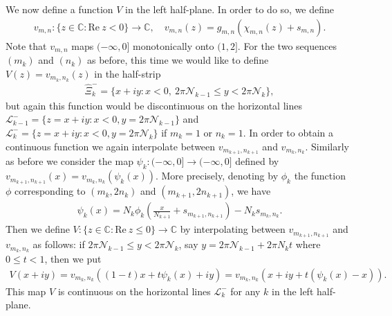 \documentclass[12pt]{amsart}
\numberwithin{equation}{section}
\begin{document}
We now define a function $V$ in the left half-plane. In order to do so, we define
\begin{equation*}
\begin{split}
v_{m,n}:\{z\in\mathbb{C}: \text{Re}\ z< 0\}\to \mathbb{C},  \quad v_{m,n}(z)=g_{m,n}\left(\chi_{m,n}(z)+s_{m,n}\right).
\end{split}
\end{equation*}
Note that $v_{m,n}$ maps $(-\infty,0]$ monotonically onto $(1,2]$. For the two sequences $(m_k)$ and $(n_k)$ as before, this time we would like to define $V(z)=v_{m_k,n_k}(z)$ in the half-strip
\begin{equation}\label{halfstrip-2}
\begin{split}
\hat{\Xi}_k^{-}=\{x+iy: x<0, \ 2\pi \mathcal{N}_{k-1}\leq y<2\pi \mathcal{N}_k\},
\end{split}
\end{equation}
but again this function would be discontinuous on the horizontal lines $\mathcal{L}^{-}_{k-1}=\{z=x+iy: x<0, y=2\pi\mathcal{N}_{k-1}\}$ and $\mathcal{L}^{-}_k=\{z=x+iy: x<0, y=2\pi\mathcal{N}_{k}\}$ if $m_k=1$ or $n_k=1$. In order to obtain a continuous function we again interpolate between $v_{m_{k+1},n_{k+1}}$ and $v_{m_k,n_k}$. Similarly as before we consider the map $\psi_k:(-\infty,0]\to (-\infty,0]$ defined by $v_{m_{k+1},n_{k+1}}(x)=v_{m_k,n_k}(\psi_k(x))$. More precisely, denoting by $\phi_k$ the function $\phi$ corresponding to $(m_k,2n_k)$ and $(m_{k+1},2n_{k+1})$, we have
\begin{equation}\label{recuree1pm-diff-01}
\begin{split}
\psi_k(x)=N_k\phi_k\left(\frac{x}{N_{k+1}}+s_{m_{k+1},n_{k+1}}\right)-N_ks_{m_{k},n_{k}}.
\end{split}
\end{equation}
Then we define $V:\{z\in \mathbb{C}:
\text{Re}\ z\leq 0\}\to \mathbb{C}$ by interpolating between $v_{m_{k+1},n_{k+1}}$ and $v_{m_k,n_k}$ as follows: if $2\pi \mathcal{N}_{k-1}\leq y<2\pi \mathcal{N}_k$, say $y=2\pi \mathcal{N}_{k-1}+2\pi N_kt$ where $0\leq t<1$, then we put
\begin{equation*}
\begin{split}
V(x+iy)=v_{m_{k},n_{k}}((1-t)x+t\psi_k(x)+iy)=v_{m_{k},n_{k}}(x+iy+t(\psi_k(x)-x)).
\end{split}
\end{equation*}
This map $V$ is continuous on the horizontal lines $\mathcal{L}^{-}_{k}$ for any $k$ in the left half-plane.
\end{document}
